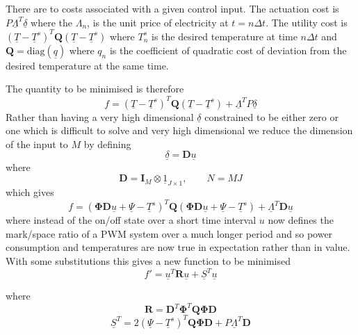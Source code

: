 \documentclass[11pt]{article}
\begin{document}
\section{}
There are to costs associated with a given control input. The actuation cost is $P\underline{\Lambda}^{T} \underline{\delta}$ where the $\Lambda_{n}$, is the unit price of electricity at $t=n \Delta t$. The utility cost is $(\underline{T}-\underline{T}^s)^{T}\mathbf{Q}(\underline{T}-\underline{T}^s)$ where ${T}^{s}_{n}$ is the desired temperature at time $n \Delta t$ and $\mathbf{Q}=\mathrm{diag}(\underline{q})$ where $q_{n}$ is the coefficient of quadratic cost of deviation from the desired temperature at the same time.

The quantity to be minimised is therefore
\begin{equation}
f = (\underline{T}-\underline{T}^s)^{T}\mathbf{Q}(\underline{T}-\underline{T}^s)+\underline{\Lambda}^{T} P\underline{\delta}
\end{equation}
Rather than having a very high dimensional $\underline{\delta}$ constrained to be either zero or one which is difficult to solve and very high dimensional we reduce the dimension of the input to $M$ by defining
\begin{equation}
\underline{\delta}=\mathbf{D}\underline{u}
\end{equation}
where
\begin{equation}
\mathbf{D}=\mathbf{I}_{M} \otimes \underline{1}_{J \times 1},\qquad N=MJ
\end{equation}
which gives
\begin{equation}
f = (\mathbf{\Phi} \mathbf{D}\underline{u}+\underline{\Psi}-\underline{T}^s)^{T}\mathbf{Q}(\mathbf{\Phi} \mathbf{D}\underline{u}+\underline{\Psi}-\underline{T}^s)+\underline{\Lambda}^{T} \mathbf{D}\underline{u}
\end{equation}
where instead of the on/off state over a short time interval $u$ now defines the mark/space ratio of a PWM system over a much longer period and so power consumption and temperatures are now true in expectation rather than in value. With some substitutions this gives a new function to be minimised
\begin{equation}
f'=\underline{u}^{T}\mathbf{R}\underline{u}+\underline{S}^{T}\underline{u}
\end{equation}

where
\begin{equation}
\mathbf{R}=\mathbf{D}^{T}\mathbf{\Phi}^{T}\mathbf{Q}\mathbf{\Phi}\mathbf{D}
\end{equation}
\begin{equation}
\underline{S}^{T}=2(\underline{\Psi}-\underline{T}^s)^{T}\mathbf{Q}\mathbf{\Phi}\mathbf{D}+P\underline{\Lambda}^{T} \mathbf{D}
\end{equation}
\end{document}
